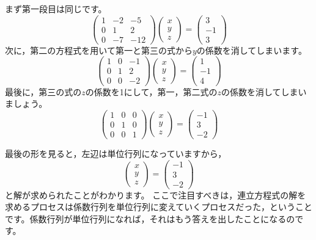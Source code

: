 \documentclass{ltjsbook}
\begin{document}
まず第一段目は同じです。
\[
    \begin{pmatrix} 1 & -2 & -5  \\
                0 & 1  & 2   \\
                0 & -7 & -12\end{pmatrix}
    \begin{pmatrix} x \\ y \\ z \end{pmatrix}
    =
    \begin{pmatrix} 3 \\ -1 \\ 3 \end{pmatrix}
\]
次に，第二の方程式を用いて第一と第三の式から$y$の係数を消してしまいます。
\[
    \begin{pmatrix} 1 & 0 & -1 \\
                0 & 1 & 2  \\
                0 & 0 & -2\end{pmatrix}
    \begin{pmatrix} x \\ y \\ z \end{pmatrix}
    =
    \begin{pmatrix} 1 \\ -1 \\ 4 \end{pmatrix}
\]
最後に，第三の式の$z$の係数を1にして，第一，第二式の$z$の係数を消してしまいましょう。
\[
    \begin{pmatrix} 1 & 0 & 0 \\
                0 & 1 & 0 \\
                0 & 0 & 1\end{pmatrix}
    \begin{pmatrix} x \\ y \\ z \end{pmatrix}
    =
    \begin{pmatrix} -1 \\ 3 \\ -2 \end{pmatrix}
\]

最後の形を見ると，左辺は単位行列になっていますから，
\[
    \begin{pmatrix}
        x \\
        y \\
        z
    \end{pmatrix}
    =
    \begin{pmatrix}
        -1 \\
        3  \\
        -2
    \end{pmatrix}
\]
と解が求められたことがわかります。
ここで注目すべきは，連立方程式の解を求めるプロセスは係数行列を単位行列に変えていくプロセスだった，ということです。係数行列が単位行列になれば，それはもう答えを出したことになるのです。
\end{document}
